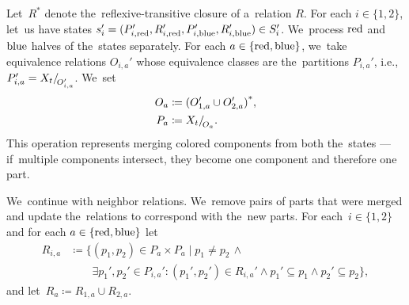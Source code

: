 Let~\( R^* \) denote the~reflexive-transitive closure of a~relation \( R \).
For each \( i \in \{1, 2\} \), let~us have states
\( s_i' = (P_{i,\text{red}}', R_{i,\text{red}}', P_{i,\text{blue}}', R_{i,\text{blue}}') \in S_i' \).
%
We~process \( \text{red} \) and \( \text{blue} \) halves of the~states separately.
For each \( a \in \{\text{red}, \text{blue}\} \),
we~take equivalence relations \( O_{i, a}' \)
whose equivalence classes are the~partitions \( P_{i, a}' \), i.e.,
\( P_{i, a}' = X_t{/\!}_{O_{i, a}'}\).
We~set
%
\begin{equation}%
	\label{eq:fpt_reflexive_transitive_closure}
	\begin{aligned}
		O_a & \coloneqq {(O_{1, a}' \cup O_{2, a}')}^*, \\
		P_a & \coloneqq \equivclass{X_t}{O_a}.
	\end{aligned}
\end{equation}
%
This operation represents merging colored components from both the~states
--- if~multiple components intersect, they become one
component and therefore one part.

We~continue with neighbor relations. We~remove pairs of parts
that were merged and update the~relations to correspond with the~new parts.
For each~\( i \in \{1, 2\} \) and for each \( a \in \{\text{red}, \text{blue}\} \) let
%
\begin{align*}
	R_{i,a} & \coloneqq \{(p_1, p_2) \in P_a \times P_a \mid p_{1} \ne p_{2} \, \land                                                 \\
	        & \qquad \exists p_1', p_2' \in P_{i,a}' : (p_1', p_2') \in R_{i,a}' \land p_1' \subseteq p_1 \land p_2' \subseteq p_2\},
\end{align*}
%
and let~\( R_a \coloneqq R_{1,a} \cup R_{2,a} \).

